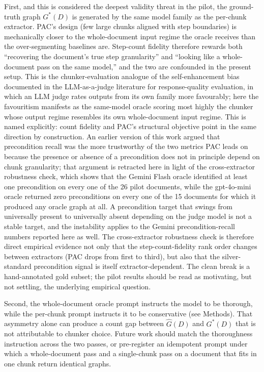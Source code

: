\documentclass[make,article,submit,oneauthor,pdftex]{Definitions/mdpi}
\begin{document}
First, and this is considered the deepest validity threat in the
pilot, the ground-truth graph $G^{*}(D)$ is generated by the same
model family as the per-chunk extractor. PAC's design (few large
chunks aligned with step boundaries) is mechanically closer to the
whole-document input regime the oracle receives than the
over-segmenting baselines are. Step-count fidelity therefore rewards
both ``recovering the document's true step granularity'' and ``looking
like a whole-document pass on the same model,'' and the two are
confounded in the present setup. This is the chunker-evaluation
analogue of the self-enhancement bias documented in the LLM-as-a-judge
literature for response-quality
evaluation\cite{zheng2023judging,panickssery2024selfpref}, in which an
LLM judge rates outputs from its own family more favourably; here the
favouritism manifests as the same-model oracle scoring most highly the
chunker whose output regime resembles its own whole-document input
regime. This is named explicitly: count
fidelity and PAC's structural objective point in the same direction by
construction. An earlier version of this work argued that precondition
recall was the more trustworthy of the two metrics PAC leads on
because the presence or absence of a precondition does not in
principle depend on chunk granularity; that argument is retracted here
in light of the cross-extractor robustness check, which shows that the
Gemini Flash oracle identified at least one precondition on every
one of the 26 pilot documents, while the gpt-4o-mini oracle returned
zero preconditions on every one of the 15 documents for which it
produced any oracle graph at all. A precondition target that swings
from universally present to universally absent depending on the judge
model is not a stable target, and the instability applies to the
Gemini precondition-recall numbers reported here as well. The
cross-extractor robustness check is therefore direct empirical
evidence not only that the step-count-fidelity rank order changes
between extractors (PAC drops from first to third), but also that the
silver-standard precondition signal is itself extractor-dependent.
The clean break is a hand-annotated gold subset; the pilot results
should be read as motivating, but not settling, the underlying
empirical question.

Second, the whole-document oracle prompt instructs the model to be
thorough, while the per-chunk prompt instructs it to be conservative
(see Methods). That asymmetry alone can produce a count gap between
$\hat{G}(D)$ and $G^{*}(D)$ that is not attributable to chunker choice.
Future work should match the thoroughness instruction across the two
passes, or pre-register an idempotent prompt under which a
whole-document pass and a single-chunk pass on a document that fits in
one chunk return identical graphs.
\end{document}
